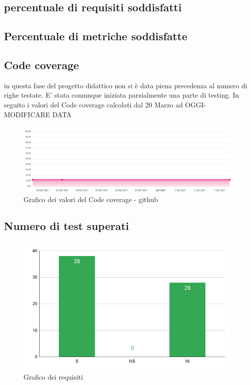 \newpage
\subsection{percentuale di requisiti soddisfatti}


\subsection{Percentuale di metriche soddisfatte}

\subsection{Code coverage}
in questa fase del progetto didattico non si è data piena precedenza al numero di righe testate. E' stata comunque
iniziata parzialmente una parte di testing. In seguito i valori del Code coverage calcolati dal 20 Marzo ad OGGI-MODIFICARE DATA
\begin{figure}[H]
    \centering
    \includegraphics[width=16 cm]{source/sections/images/CodeCoverage.png}
    \caption{Grafico dei valori del Code coverage - github}
\end{figure}


\subsection{Numero di test superati}

\begin{figure}[H]
    \centering
    \includegraphics[width=10 cm]{source/sections/images/percentuale-requisiti.png}
    \caption{Grafico dei requisiti}
\end{figure}


